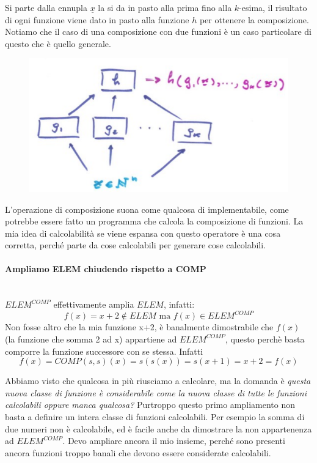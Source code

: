 \documentclass{article}
\begin{document}
Si parte dalla ennupla $\underline{x}$ la si da in pasto alla prima fino alla $k$-esima,
il risultato di ogni funzione viene dato in pasto alla funzione $h$ per ottenere la composizione.
Notiamo che il caso di una composizione con due funzioni è un caso particolare di questo che è
quello generale.
\begin{figure}[H]
    \centering
    \includegraphics[scale=0.5]{images/composizione_ooperazine.png}
\end{figure}
L'operazione di composizione suona come qualcosa di implementabile, come potrebbe essere
fatto un programma che calcola la composizione di funzioni. La mia idea di calcolabilità
se viene espansa con questo operatore è una cosa corretta, perché parte da cose calcolabili
per generare cose calcolabili.
\paragraph{Ampliamo ELEM chiudendo rispetto a COMP}\mbox{}\\
$ELEM^{COMP}$ effettivamente amplia $ELEM$, infatti:
$$f(x)=x+2\notin ELEM\text{ ma }f(x)\in ELEM^{COMP}$$
Non fosse altro che la mia funzione x+2, è banalmente dimostrabile che $f(x)$ (la funzione
che somma 2 ad x) appartiene ad $ELEM^{COMP}$, questo perchè basta
comporre la funzione successore con se stessa. Infatti $$f(x)=COMP(s,s)(x)=s(s(x))=s(x+1)=x+2=f(x)$$

Abbiamo visto che qualcosa in più riusciamo a calcolare, ma la domanda è \textit{questa
    nuova classe di funzione è considerabile come la nuova classe di tutte le funzioni
    calcolabili oppure manca qualcosa?} Purtroppo questo primo ampliamento non basta a definire
un intera classe di funzioni calcolabili. Per esempio la somma di due numeri non è
calcolabile, ed è facile anche da dimostrare la non appartenenza ad $ELEM^{COMP}$. Devo
ampliare ancora il mio insieme, perché sono presenti ancora funzioni troppo banali che devono
essere considerate calcolabili.
\end{document}
